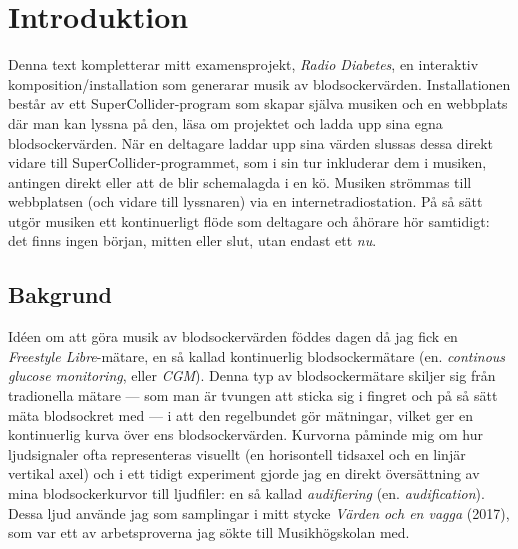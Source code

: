 \documentclass[11pt, a4paper]{article} %
\begin{document}



\tableofcontents
\clearpage


\newpage

\section*{Introduktion}
Denna text kompletterar mitt examensprojekt, \emph{Radio Diabetes}, en interaktiv komposition/installation som generarar musik av blodsockervärden. Installationen består av ett SuperCollider-program som skapar själva musiken och en webbplats där man kan lyssna på den, läsa om projektet och ladda upp sina egna blodsockervärden. När en deltagare laddar upp sina värden slussas dessa direkt vidare till SuperCollider-programmet, som i sin tur inkluderar dem i musiken, antingen direkt eller att de blir schemalagda i en kö. Musiken strömmas till webbplatsen (och vidare till lyssnaren) via en internetradiostation. På så sätt utgör musiken ett kontinuerligt flöde som deltagare och åhörare hör samtidigt: det finns ingen början, mitten eller slut, utan endast ett \emph{nu}. %



\subsection*{Bakgrund}
Idéen om att göra musik av blodsockervärden föddes dagen då jag fick en \emph{Freestyle Libre}-mätare, en så kallad kontinuerlig blodsockermätare (en. \emph{continous glucose monitoring}, eller \emph{CGM}). Denna typ av blodsockermätare skiljer sig från tradionella mätare --- som man är tvungen att sticka sig i fingret och på så sätt mäta blodsockret med --- i att den regelbundet gör mätningar, vilket ger en kontinuerlig kurva över ens blodsockervärden. Kurvorna påminde mig om hur ljudsignaler ofta representeras visuellt (en horisontell tidsaxel och en linjär vertikal axel) och i ett tidigt experiment gjorde jag en direkt översättning av mina blodsockerkurvor till ljudfiler: en så kallad \emph{audifiering} (en. \emph{audification}). Dessa ljud använde jag som samplingar i mitt stycke \emph{Värden och en vagga} (2017), som var ett av arbetsproverna jag sökte till Musikhögskolan med. 
\end{document}
